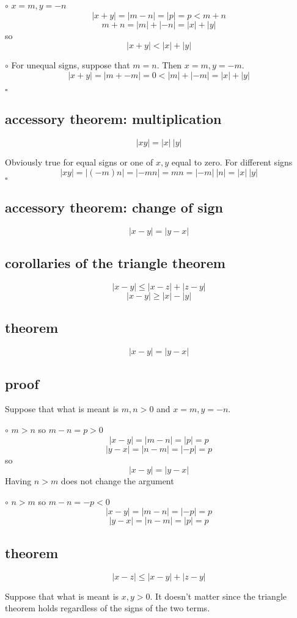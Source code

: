 \documentclass[11pt, oneside]{article}
\begin{document}
$\circ$  $x = m, y = -n$
\[ |x + y| = |m - n| = |p| = p < m + n \]
\[ m + n = |m| + |-n| = |x| + |y| \]
so
\[ |x + y| < |x| + |y| \]

$\circ$  For unequal signs, suppose that $m=n$.  Then $x = m, y = -m$.
\[ |x + y| = |m + -m| = 0 < |m| + |-m| = |x| + |y| \]

$\square$

\subsection*{accessory theorem:  multiplication}
\[ |xy| = |x| \ |y| \]

Obviously true for equal signs or one of $x,y$ equal to zero.  For different signs
\[ |xy| = |(-m)n| = |-mn| = mn = |-m| \ |n| = |x| \ |y| \]
$\square$

\subsection*{accessory theorem:  change of sign}
\[ |x - y| = |y - x| \]

\subsection*{corollaries of the triangle theorem}
\[ |x - y| \le |x - z| + |z - y| \]
\[ |x - y| \ge |x| - |y| \]

\subsection*{theorem}
\[ |x - y| = |y - x| \]
\subsection*{proof}
Suppose that what is meant is $m,n > 0$ and $x = m, y =-n$.

$\circ$  $m > n$ so $m - n = p > 0$
\[ |x - y| = |m - n| = |p| = p \]
\[ |y - x| = |n - m| = |-p| = p \]
so
\[ |x - y| = |y - x| \]
Having $n > m$ does not change the argument

$\circ$  $n > m$ so $m - n = -p < 0$
\[ |x - y| = |m - n| = |-p| = p \]
\[ |y - x| = |n - m| = |p| = p \]

\subsection*{theorem}
\[ |x - z|  \le |x - y| + |z - y| \]

Suppose that what is meant is $x,y > 0$.  It doesn't matter since the triangle theorem holds regardless of the signs of the two terms.
\end{document}
